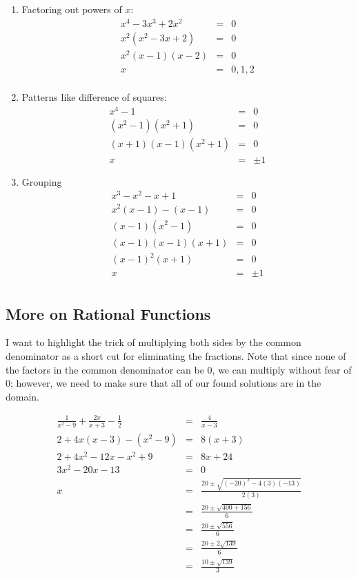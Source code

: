 \documentclass[letterpaper,12pt,fleqn]{article}
\begin{document}
\begin{enumerate}
\item Factoring out powers of $x$:
  \begin{eqnarray*}
    x^4-3x^3+2x^2 &=& 0 \\
    x^2(x^2-3x+2) &=& 0 \\
    x^2(x-1)(x-2) &=& 0 \\
    x &=& 0,1,2 \\
  \end{eqnarray*}

\item Patterns like difference of squares:
  \begin{eqnarray*}
    x^4-1 &=& 0 \\
    (x^2-1)(x^2+1) &=& 0 \\
    (x+1)(x-1)(x^2+1) &=& 0 \\
    x &=& \pm1
  \end{eqnarray*}

\item Grouping
  \begin{eqnarray*}
    x^3-x^2-x+1 &=& 0 \\
    x^2(x-1)-(x-1) &=& 0 \\
    (x-1)(x^2-1) &=& 0 \\
    (x-1)(x-1)(x+1) &=& 0 \\
    (x-1)^2(x+1) &=& 0 \\
    x &=& \pm1 \\
  \end{eqnarray*}
\end{enumerate}

\subsection*{More on Rational Functions}

I want to highlight the trick of multiplying both sides by the common
denominator as a short cut for eliminating the fractions. Note that since
none of the factors in the common denominator can be 0, we can multiply without
fear of 0; however, we need to make sure that all of our found solutions are
in the domain.

\begin{example}
  \begin{eqnarray*}
    \frac{1}{x^2-9}+\frac{2x}{x+3}-\frac{1}{2} &=& \frac{4}{x-3} \\
    2+4x(x-3)-(x^2-9) &=& 8(x+3) \\
    2+4x^2-12x-x^2+9 &=& 8x+24 \\
    3x^2-20x-13 &=& 0 \\
    x &=& \frac{20\pm\sqrt{(-20)^2-4(3)(-13)}}{2(3)} \\
    &=& \frac{20\pm\sqrt{400+156}}{6} \\
    &=& \frac{20\pm\sqrt{556}}{6} \\
    &=& \frac{20\pm2\sqrt{139}}{6} \\
    &=& \frac{10\pm\sqrt{139}}{3} \\
  \end{eqnarray*}
\end{example}
\end{document}
